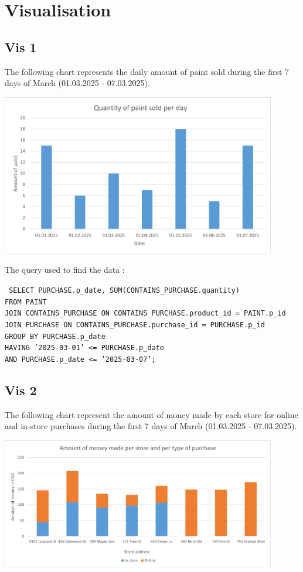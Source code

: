 \documentclass[a4paper,11pt]{article}
\begin{document}
\section*{Visualisation}

\subsection*{Vis 1}

The following chart represents the daily amount of paint sold during the first 7 days of March (01.03.2025 - 07.03.2025).

\includegraphics[width=0.9\textwidth]{images/Vis1.png}

The query used to find the data :
\newline

\noindent\texttt{
SELECT PURCHASE.p\_date, SUM(CONTAINS\_PURCHASE.quantity)\\
FROM PAINT \\
JOIN CONTAINS\_PURCHASE ON CONTAINS\_PURCHASE.product\_id = PAINT.p\_id\\
JOIN PURCHASE ON CONTAINS\_PURCHASE.purchase\_id = PURCHASE.p\_id\\
GROUP BY PURCHASE.p\_date\\
HAVING '2025-03-01' <= PURCHASE.p\_date \\
AND PURCHASE.p\_date <= '2025-03-07';
}

\subsection*{Vis 2}

The following chart represent the amount of money made by each store for online and in-store purchases during the first 7 days of March (01.03.2025 - 07.03.2025).

\includegraphics[width=0.9\textwidth]{images/Vis2.png}
\end{document}
